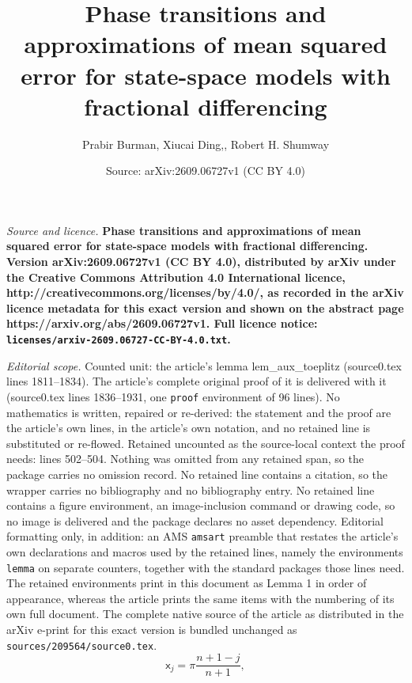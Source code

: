 \documentclass[10pt,a4paper]{amsart}
\title{\bf Phase transitions and approximations of mean squared error for state-space models with fractional differencing}
\author{Prabir Burman, Xiucai Ding,, Robert H. Shumway}
\date{Source: arXiv:2609.06727v1 (CC BY 4.0)}
\newcommand{\sfx}{\mathsf{x}}
\begin{document}
\maketitle

\noindent\emph{Source and licence.} \bf Phase transitions and approximations of mean squared error for state-space models with fractional differencing. Version arXiv:2609.06727v1 (CC BY 4.0), distributed by arXiv under the Creative Commons Attribution 4.0 International licence, http://creativecommons.org/licenses/by/4.0/, as recorded in the arXiv licence metadata for this exact version and shown on the abstract page https://arxiv.org/abs/2609.06727v1. Full licence notice: \texttt{licenses/arxiv-2609.06727-CC-BY-4.0.txt}.\par\smallskip

\noindent\textit{Editorial scope.} Counted unit: the article's lemma lem\_aux\_toeplitz (source0.tex lines 1811--1834). The article's complete original proof of it is delivered with it (source0.tex lines 1836--1931, one \texttt{proof} environment of 96 lines). No mathematics is written, repaired or re-derived: the statement and the proof are the article's own lines, in the article's own notation, and no retained line is substituted or re-flowed.  Retained uncounted as the source-local context the proof needs: lines 502--504.  Nothing was omitted from any retained span, so the package carries no omission record.  No retained line contains a citation, so the wrapper carries no bibliography and no bibliography entry.  No retained line contains a figure environment, an image-inclusion command or drawing code, so no image is delivered and the package declares no asset dependency.  Editorial formatting only, in addition: an AMS \texttt{amsart} preamble that restates the article's own declarations and macros used by the retained lines, namely the environments \texttt{lemma} on separate counters, together with the standard packages those lines need.  The retained environments print in this document as Lemma 1 in order of appearance, whereas the article prints the same items with the numbering of its own full document.  The complete native source of the article as distributed in the arXiv e-print for this exact version is bundled unchanged as \texttt{sources/209564/source0.tex}.
\begin{equation}\label{eq_points}
\sfx_j=\pi\frac{n+1-j}{n+1},
\end{equation}
\end{document}
